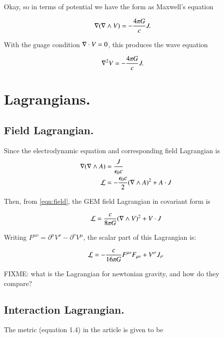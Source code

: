 \documentclass{article}
\begin{document}
Okay, so in terms of potential we have the form as Maxwell's equation

\begin{align}\label{eqn:field}
\nabla (\nabla \wedge V) &= -\frac{4\pi G}{c} J.
\end{align}

With the guage condition $\nabla \cdot V = 0$, this produces the wave equation

\begin{align}
\nabla^2 V &= -\frac{4\pi G}{c} J.
\end{align}

\section{ Lagrangians. }

\subsection{ Field Lagrangian. }

Since the electrodynamic equation and corresponding field Lagrangian is
\begin{align*}
\nabla (\nabla \wedge A) &= \frac{J}{\epsilon_0 c} \\
\mathcal{L} &= -\frac{\epsilon_0 c}{2} (\nabla \wedge A)^2 + A \cdot J
\end{align*}

Then, from \ref{eqn:field}, the GEM field Lagrangian in covariant form is

\begin{align*}
\mathcal{L} &= \frac{c}{8 \pi G} (\nabla \wedge V)^2 + V \cdot J \\
\end{align*}

Writing $F^{\mu\nu} = \partial^\mu V^\nu - \partial^\nu V^\mu$, the scalar part of this Lagrangian is:

\begin{align*}
\mathcal{L} &= -\frac{c}{16 \pi G} F^{\mu\nu} F_{\mu\nu} + V^\sigma J_\sigma \\
\end{align*}

FIXME: what is the Lagrangian for newtonian gravity, and how do they compare?

\subsection{ Interaction Lagrangian. }

The metric (equation 1.4) in the article is given to be
\end{document}
